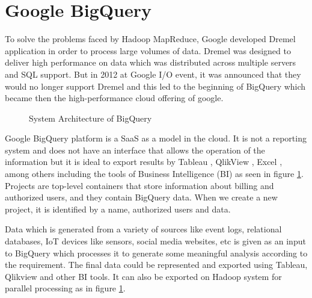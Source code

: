 \documentclass[9pt,twocolumn,twoside]{../../styles/osajnl}
\begin{document}

\section{Google BigQuery}
To solve the problems faced by Hadoop\cite{www-apache-hadoop}
MapReduce\cite{mapreduce-article}, Google developed Dremel \CE application
in order to process large volumes of data. Dremel was designed to
deliver high performance on data which was distributed across multiple
servers and SQL support. But in 2012 at Google I/O event, it was
announced that they would no longer support Dremel and this led to the
beginning of BigQuery which became then the high-performance cloud
offering of google.

\begin{figure}[htbp]
\centering
{}
\caption{\cite{www-bigquery-slideshare} System Architecture of BigQuery}
\label{fig:architecture}
\end{figure}

\noindent
Google BigQuery \cite{bigquery-paper} platform is a SaaS as a model in
the cloud. It is not a reporting system and does not have an interface
that allows the operation of the information but it is ideal to export
results by Tableau \CE , QlikView \CE , Excel \CE , among others including
the tools of Business Intelligence (BI) as seen in figure
\ref{fig:architecture}.
Projects are top-level containers that store
information about billing and authorized users, and they contain
BigQuery data. When we create a new project, it is identified by a
name, authorized users and data\cite{www-bigquery-documentation}.

\noindent
Data which is generated from a variety of sources like event logs,
relational databases, IoT devices like sensors, social media websites,
etc is given as an input to BigQuery which processes it to generate
some meaningful analysis according to the requirement. The final data
could be represented and exported using Tableau, Qlikview and other BI
tools. It can also be exported on Hadoop system for parallel
processing as in figure \ref{fig:architecture}.
\end{document}
